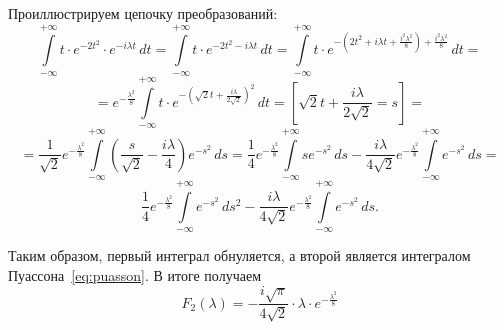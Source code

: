 \documentclass[a4paper, 11pt]{article}
\newcommand{\myint}[4]{\int\limits_{#1}^{#2}#3\,d#4}
\begin{document}
        Проиллюстрируем цепочку преобразований: 
        $$
            \myint{-\infty}{+\infty}{t \cdot e^{-2t^2} \cdot e^{-i\lambda  t}}{t} = \myint{-\infty}{+\infty}{t \cdot e^{-2t^2-i\lambda  t}}{t} =\myint{-\infty}{+\infty}{t \cdot e^{-\left(2t^2+i\lambda t+\frac{i^2\lambda^2}{8}\right)+\frac{i^2\lambda^2}{8}}}{t} = 
        $$
        $$
            = e^{-\frac{\lambda^2}{8}}\myint{-\infty}{+\infty}{t \cdot e^{-\left( \sqrt{2}t+\frac{i\lambda}{2\sqrt{2}}\right)^2}}{t}=\left[\sqrt{2}t+\frac{i\lambda}{2\sqrt{2}}=s\right]=
        $$
        $$
            =\frac{1}{\sqrt{2}}e^{-\frac{\lambda^2}{8}}\myint{-\infty}{+\infty}{\left(\frac{s}{\sqrt{2}}-\frac{i\lambda}{4}\right)e^{-s^2}}{s}=\frac{1}{4}e^{-\frac{\lambda^2}{8}}\myint{-\infty}{+\infty}{se^{-s^2}}{s} - \frac{i\lambda}{4\sqrt{2}}e^{-\frac{\lambda^2}{8}}\myint{-\infty}{+\infty}{e^{-s^2}}{s}=
        $$
        $$
            \frac{1}{4}e^{-\frac{\lambda^2}{8}}\myint{-\infty}{+\infty}{e^{-s^2}}{s^2} - \frac{i\lambda}{4\sqrt{2}}e^{-\frac{\lambda^2}{8}}\myint{-\infty}{+\infty}{e^{-s^2}}{s}.
        $$
        
        Таким образом, первый интеграл обнуляется, а второй является интегралом Пуассона~\eqref{eq:puasson}. В итоге получаем
        $$
            F_2(\lambda) = -\frac{i \sqrt{\pi}}{4\sqrt{2}} \cdot \lambda \cdot e^{-\frac{\lambda^2}{8}}
        $$

\clearpage
\end{document}
